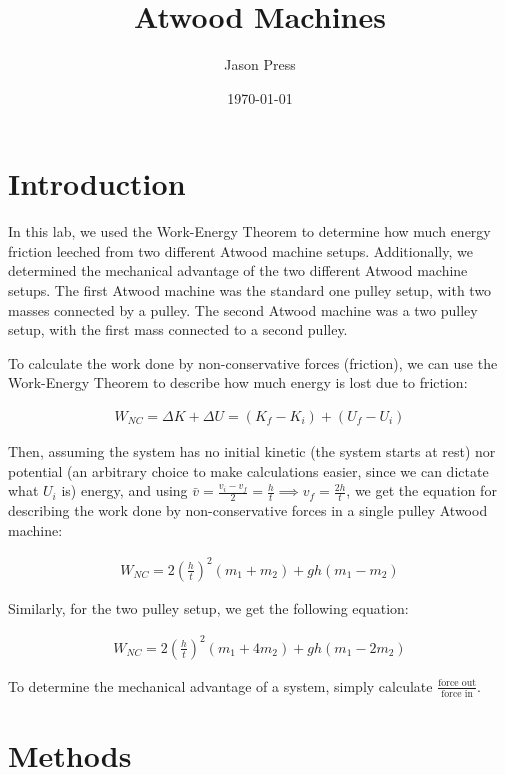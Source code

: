 \documentclass[12pt]{article}
\author{Jason Press}
\date{\today}
\title{Atwood Machines}
\begin{document}
\maketitle
\section{Introduction}
\label{sec:org3509a0c}

In this lab, we used the Work-Energy Theorem to determine how much energy friction leeched from two different Atwood machine setups. Additionally, we determined the mechanical advantage of the two different Atwood machine setups. The first Atwood machine was the standard one pulley setup, with two masses connected by a pulley. The second Atwood machine was a two pulley setup, with the first mass connected to a second pulley.

To calculate the work done by non-conservative forces (friction), we can use the Work-Energy Theorem to describe how much energy is lost due to friction:

\begin{align*}
W_{NC} = \Delta K + \Delta U = (K_f - K_i) + (U_f - U_i)
\end{align*}

Then, assuming the system has no initial kinetic (the system starts at rest) nor potential (an arbitrary choice to make calculations easier, since we can dictate what \(U_i\) is) energy, and using \(\bar{v} = \frac{v_i - v_{f}}{2} = \frac{h}{t} \implies v_f = \frac{2h}{t}\), we get the equation for describing the work done by non-conservative forces in a single pulley Atwood machine:

\begin{align}\label{eq:single}
W_{NC} = 2 \left( \frac{h}{t} \right)^2 (m_1 + m_2) + g h (m_1 - m_2)
\end{align}

Similarly, for the two pulley setup, we get the following equation:

\begin{align}\label{eq:double}
W_{NC} = 2 \left( \frac{h}{t} \right)^2 (m_1 + 4 m_2) + g h (m_1 - 2 m_2)
\end{align}

To determine the mechanical advantage of a system, simply calculate \(\frac{\text{force out}}{\text{force in}}\).
\section{Methods}
\label{sec:org2fe9976}
\end{document}
